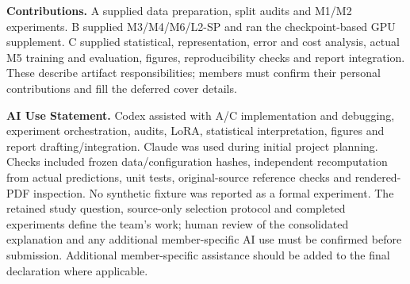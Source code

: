 \documentclass[a4paper,10pt]{article}
\begin{document}
\textbf{Contributions.} A supplied data preparation, split audits and M1/M2 experiments. B supplied M3/M4/M6/L2-SP and ran the checkpoint-based GPU supplement. C supplied statistical, representation, error and cost analysis, actual M5 training and evaluation, figures, reproducibility checks and report integration. These describe artifact responsibilities; members must confirm their personal contributions and fill the deferred cover details.

\textbf{AI Use Statement.} Codex assisted with A/C implementation and debugging, experiment orchestration, audits, LoRA, statistical interpretation, figures and report drafting/integration. Claude was used during initial project planning. Checks included frozen data/configuration hashes, independent recomputation from actual predictions, unit tests, original-source reference checks and rendered-PDF inspection. No synthetic fixture was reported as a formal experiment. The retained study question, source-only selection protocol and completed experiments define the team's work; human review of the consolidated explanation and any additional member-specific AI use must be confirmed before submission. Additional member-specific assistance should be added to the final declaration where applicable.
\label{mainend}
\end{document}
